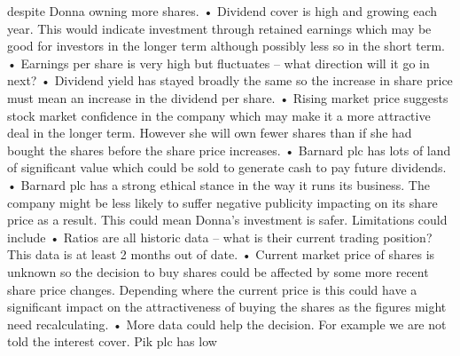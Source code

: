 \documentclass{article}
\begin{document}
despite Donna owning more shares. \newline
• Dividend cover is high and growing each year.  This would indicate investment through retained \newline
earnings which may be good for investors in the longer term although possibly less so in the  \newline
short term. \newline
• Earnings per share is very high but fluctuates – what direction will it go in next? \newline
• Dividend yield has stayed broadly the same so the increase in share price must mean an increase in \newline
the dividend per share. \newline
• Rising market price suggests stock market confidence in the company which may make it a more \newline
attractive deal in the longer term.  However she will own fewer shares than if she had bought the \newline
shares before the share price increases. \newline
• Barnard plc has lots of land of significant value which could be sold to generate cash to pay future \newline
dividends. \newline
• Barnard plc has a strong ethical stance in the way it runs its business.  The company might be less \newline
likely to suffer negative publicity impacting on its share price as a result.  This could mean Donna’s \newline
investment is safer. \newline
 \newline
Limitations could include \newline
• Ratios are all historic data – what is their current trading position?  This data is at least 2 months out of \newline
date. \newline
• Current market price of shares is unknown so the decision to buy shares could be affected by some \newline
more recent share price changes.  Depending where the current price is this could have a significant \newline
impact on the attractiveness of buying the shares as the figures might need recalculating. \newline
• More data could help the decision.  For example we are not told the interest cover.  Pik plc has low \newline
\end{document}

